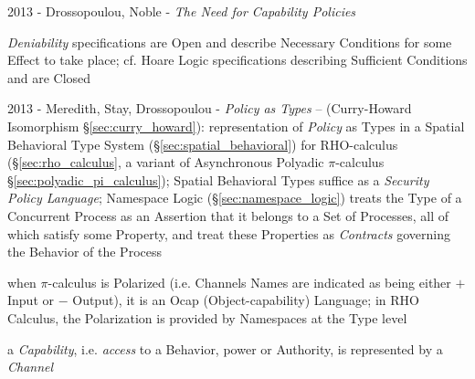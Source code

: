 2013 - Drossopoulou, Noble - \emph{The Need for Capability Policies}

\emph{Deniability} specifications are Open and describe Necessary Conditions for
some Effect to take place; cf. Hoare Logic specifications describing Sufficient
Conditions and are Closed

2013 - Meredith, Stay, Drossopoulou - \emph{Policy as Types} -- (Curry-Howard
Isomorphism \S\ref{sec:curry_howard}): representation of \emph{Policy} as Types
in a Spatial Behavioral Type System (\S\ref{sec:spatial_behavioral}) for
RHO-calculus (\S\ref{sec:rho_calculus}, a variant of Asynchronous Polyadic
$\pi$-calculus \S\ref{sec:polyadic_pi_calculus}); Spatial Behavioral Types
suffice as a \emph{Security Policy Language}; Namespace Logic
(\S\ref{sec:namespace_logic}) treats the Type of a Concurrent Process as an
Assertion that it belongs to a Set of Processes, all of which satisfy some
Property, and treat these Properties as \emph{Contracts} governing the Behavior
of the Process

when $\pi$-calculus is Polarized (i.e. Channels Names are indicated as being
either $+$ Input or $-$ Output), it is an Ocap (Object-capability) Language; in
RHO Calculus, the Polarization is provided by Namespaces at the Type level

a \emph{Capability}, i.e. \emph{access} to a Behavior, power or Authority, is
represented by a \emph{Channel}
